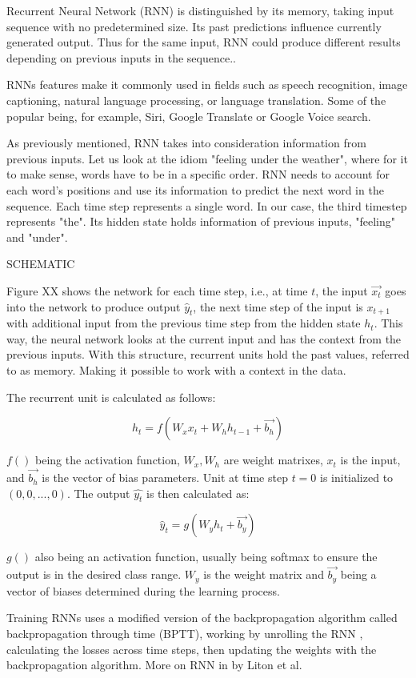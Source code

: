 Recurrent Neural Network (RNN) is distinguished by its memory, taking input sequence with no predetermined size. Its past predictions influence currently generated output. Thus for the same input, RNN could produce different results depending on previous inputs in the sequence.\cite{rnnDSmedium}.

RNNs features make it commonly used in fields such as speech recognition, image captioning, natural language processing, or language translation. Some of the popular being, for example, Siri, Google Translate or Google Voice search.\cite{ibmrnn}

As previously mentioned, RNN takes into consideration information from previous inputs. Let us look at the idiom "feeling under the weather", where for it to make sense, words have to be in a specific order. RNN needs to account for each word's positions and use its information to predict the next word in the sequence. Each time step represents a single word. In our case, the third timestep represents "the". Its hidden state holds information of previous inputs, "feeling" and "under".\cite{ibmrnn}

SCHEMATIC

Figure XX shows the network for each time step, i.e., at time $t$, the input $\vec{x_t}$ goes into the network to produce output $\hat{y}_t$, the next time step of the input is $x_{t+1}$ with additional input from the previous time step from the hidden state $h_{t}$. This way, the neural network looks at the current input and has the context from the previous inputs.
With this structure, recurrent units hold the past values, referred to as memory. Making it possible to work with a context in the data.
\cite{rnnin6}

The recurrent unit is calculated as follows:

\begin{equation}
    {h_t = f(W_{x}x_t + W_{h}h_{t-1}+\vec{b_h})}
\end{equation}

$f()$ being the activation function, $W_x,W_h$ are weight matrixes, $x_t$ is the input, and $\vec{b_h}$ is the vector of bias parameters. Unit at time step $t=0$ is initialized to $(0,0,...,0)$. The output $\hat{y_t}$ is then calculated as:

\begin{equation}
    {\hat{y}_t = g(W_{y}h_t + \vec{b_y})}
\end{equation}

$g()$ also being an activation function, usually being softmax to ensure the output is in the desired class range. $W_y$ is the weight matrix and $\vec{b_y}$ being a vector of biases determined during the learning process.

Training RNNs uses a modified version of the backpropagation algorithm called backpropagation through time (BPTT), working by unrolling the RNN \cite{Goodfellow-et-al-2016}, calculating the losses across time steps, then updating the weights with the backpropagation algorithm. More on RNN in \cite{lipton2015critical} by Liton et al.





